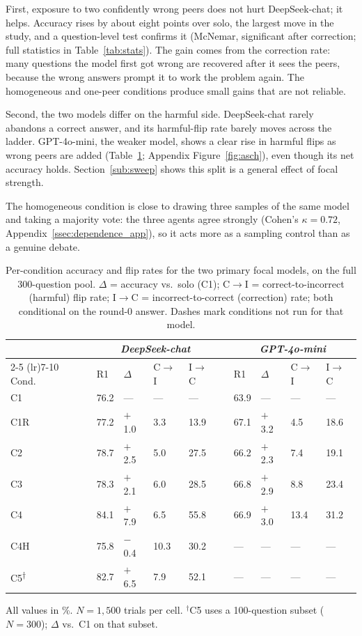 \documentclass[11pt]{article}
\begin{document}
First, exposure to two confidently wrong peers does not hurt DeepSeek-chat;
it helps.
Accuracy rises by about eight points over solo, the largest move in the
study, and a question-level test confirms it (McNemar, significant after
correction; full statistics in Table~\ref{tab:stats}).
The gain comes from the correction rate: many questions the model first got
wrong are recovered after it sees the peers, because the wrong answers
prompt it to work the problem again.
The homogeneous and one-peer conditions produce small gains that are not
reliable.

Second, the two models differ on the harmful side.
DeepSeek-chat rarely abandons a correct answer, and its harmful-flip rate
barely moves across the ladder.
GPT-4o-mini, the weaker model, shows a clear rise in harmful flips as wrong
peers are added (Table~\ref{tab:conditions}; Appendix
Figure~\ref{fig:asch}), even though its net accuracy holds.
Section~\ref{sub:sweep} shows this split is a general effect of focal
strength.

The homogeneous condition is close to drawing three samples of the same
model and taking a majority vote: the three agents agree strongly (Cohen's
$\kappa = 0.72$, Appendix~\ref{ssec:dependence_app}), so it acts more as a
sampling control than as a genuine debate.

\begin{table}[t]
\centering
\small
\caption{Per-condition accuracy and flip rates for the two primary focal
models, on the full 300-question pool. $\Delta$ = accuracy vs.\ solo (C1);
C$\to$I = correct-to-incorrect (harmful) flip rate; I$\to$C =
incorrect-to-correct (correction) rate; both conditional on the round-0
answer. Dashes mark conditions not run for that model.\label{tab:conditions}}
\begin{tabular}{@{}lllllcllll@{}}
\toprule
 & \multicolumn{4}{c}{\textit{DeepSeek-chat}} & &
      \multicolumn{4}{c}{\textit{GPT-4o-mini}} \\
\cmidrule(lr){2-5} \cmidrule(lr){7-10}
Cond. & R1 & $\Delta$ & C$\to$I & I$\to$C & &
        R1 & $\Delta$ & C$\to$I & I$\to$C \\
\midrule
C1  & 76.2 & ---    & ---  & ---  & & 63.9 & ---    & ---  & ---  \\
C1R & 77.2 & $+$1.0 & 3.3  & 13.9 & & 67.1 & $+$3.2 & 4.5  & 18.6 \\
C2  & 78.7 & $+$2.5 & 5.0  & 27.5 & & 66.2 & $+$2.3 & 7.4  & 19.1 \\
C3  & 78.3 & $+$2.1 & 6.0  & 28.5 & & 66.8 & $+$2.9 & 8.8  & 23.4 \\
C4  & 84.1 & $+$7.9 & 6.5  & 55.8 & & 66.9 & $+$3.0 & 13.4 & 31.2 \\
C4H & 75.8 & $-$0.4 & 10.3 & 30.2 & & ---  & ---    & ---  & ---  \\
C5\textsuperscript{$\dagger$} & 82.7 & $+$6.5 & 7.9 & 52.1 & & --- & --- & --- & --- \\
\bottomrule
\end{tabular}
\par\smallskip
{\footnotesize All values in \%. $N=1{,}500$ trials per cell.
$^{\dagger}$C5 uses a 100-question subset ($N=300$); $\Delta$ vs.\ C1 on that
subset.}
\end{table}
\end{document}
